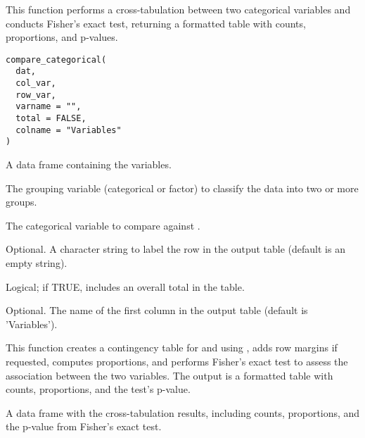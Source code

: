 \documentclass[a4paper]{book}
\begin{document}
%
\begin{Description}
This function performs a cross-tabulation between two categorical variables and conducts Fisher's exact test, returning a formatted table with counts, proportions, and p-values.
\end{Description}
%
\begin{Usage}
\begin{verbatim}
compare_categorical(
  dat,
  col_var,
  row_var,
  varname = "",
  total = FALSE,
  colname = "Variables"
)
\end{verbatim}
\end{Usage}
%
\begin{Arguments}
\begin{ldescription}
\item[\code{dat}] A data frame containing the variables.

\item[\code{col\_var}] The grouping variable (categorical or factor) to classify the data into two or more groups.

\item[\code{row\_var}] The categorical variable to compare against .

\item[\code{varname}] Optional. A character string to label the  row in the output table (default is an empty string).

\item[\code{total}] Logical; if TRUE, includes an overall total in the table.

\item[\code{colname}] Optional. The name of the first column in the output table (default is 'Variables').
\end{ldescription}
\end{Arguments}
%
\begin{Details}
This function creates a contingency table for  and  using , adds row margins if requested, computes proportions, and performs Fisher's exact test to assess the association between the two variables. The output is a formatted table with counts, proportions, and the test's p-value.
\end{Details}
%
\begin{Value}
A data frame with the cross-tabulation results, including counts, proportions, and the p-value from Fisher's exact test.
\end{Value}
\end{document}
